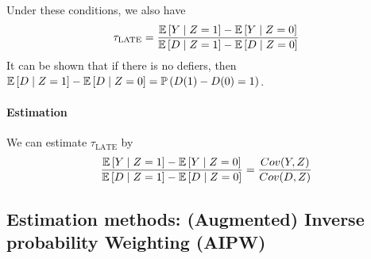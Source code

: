 Under these conditions, we also have \begin{equation*}
    \tau_{\text{LATE}} = \frac{\mathbb{E}\left[Y \mid Z=1\right]-\mathbb{E}\left[Y\mid Z=0\right]}{\mathbb{E}\left[D\mid Z=1\right]-\mathbb{E}\left[D\mid Z=0\right]}
\end{equation*}
It can be shown that if there is no defiers, then $\mathbb{E}\left[D\mid Z=1\right]-\mathbb{E}\left[D\mid Z=0\right] = \mathbb{P}\left(D(1)-D(0)=1\right)$.

\paragraph{Estimation}
We can estimate $\tau_{\text{LATE}}$ by \begin{equation*}
    \frac{\mathbb{E}\left[Y \mid Z=1\right]-\mathbb{E}\left[Y\mid Z=0\right]}{\mathbb{E}\left[D\mid Z=1\right]-\mathbb{E}\left[D\mid Z=0\right]}=\frac{Cov(Y,Z)}{Cov(D,Z)}
\end{equation*}

\subsection{Estimation methods: (Augmented) Inverse probability Weighting (AIPW)}
    

